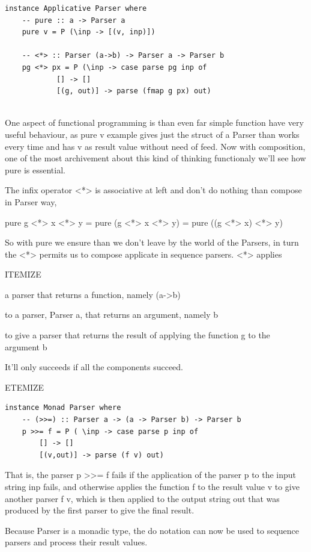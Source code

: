\documentclass[a4papert]{article}
\begin{document}
\begin{lstlisting}[style=haskellstyle]
instance Applicative Parser where
    -- pure :: a -> Parser a
    pure v = P (\inp -> [(v, inp)])

    -- <*> :: Parser (a->b) -> Parser a -> Parser b
    pg <*> px = P (\inp -> case parse pg inp of
            [] -> []
            [(g, out)] -> parse (fmap g px) out)


\end{lstlisting}
One aspect of functional programming is than even far simple function have very useful behaviour, as pure v example gives just the struct of a Parser than works every time and has v as result value without need of feed. Now with composition, one of the most archivement about this kind of thinking functionaly we'll see how pure is essential.

The infix operator <*> is associative at left and don't do nothing than compose in Parser way,

pure g <*> x <*> y = pure (g <*> x <*> y) = pure ((g <*> x) <*> y)

So with pure we ensure than we don't leave by the world of the Parsers, in turn the <*> permits us to compose applicate in sequence parsers. <*> applies

ITEMIZE

a parser that returns a function, namely (a->b)

to a parser, Parser a, that returns an argument, namely b

to give a parser that returns the result of applying the function g to the argument b

It'll only succeeds if all the components succeed.

ETEMIZE



\begin{lstlisting}[style=haskellstyle]
instance Monad Parser where
    -- (>>=) :: Parser a -> (a -> Parser b) -> Parser b
    p >>= f = P ( \inp -> case parse p inp of
        [] -> []
        [(v,out)] -> parse (f v) out)

\end{lstlisting}
That is, the parser p >>= f fails if the application of the parser p to the input string inp fails, and otherwise applies the function f to the result value v to give another parser f v, which is then applied to the output string out that was produced by the first parser to give the final result.

Because Parser is a monadic type, the do notation can now be used to sequence parsers and process their result values.
\end{document}
